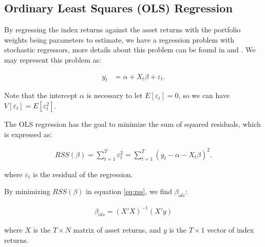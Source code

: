 \documentclass[12pt,oneside,a4paper]{memoir}
\begin{document}
\subsection{Ordinary Least Squares (OLS) Regression}

By regressing the index returns against the asset returns with the portfolio weights being parameters to estimate, we have a regression problem with stochastic regressors, more details about this problem can be found in  and .
We may represent this problem as:

\vspace{-18 pt}
\begin{align*} 
	y_{t} &= \alpha + X_{t}\beta + \varepsilon_{t}.
\end{align*}

\noindent
Note that the intercept $\alpha$ is necessary to let $E[\varepsilon_{t}]=0$, so we can have $V[\varepsilon_{t}] = E[\varepsilon_{t}^2]$.

The OLS regression has the goal to minimize the sum of squared residuals, which is expressed as:

\vspace{-18 pt}
\begin{align} \label{eq:rss}
	RSS(\beta)
	= \sum_{t=1}^{T} \varepsilon_t^2
	= \sum_{t=1}^{T} (y_t - \alpha - X_t \beta)^2.
\end{align}

\noindent
where $\varepsilon_{t}$ is the residual of the regression.

By minimizing $RSS(\beta)$ in equation \eqref{eq:rss}, we find $\beta_{ols}$:

\vspace{-18 pt}
\begin{align} 
	\label{eq:bols}
	\beta_{ols} = (X'X)^{-1}(X'y)
\end{align}

\noindent
where $X$ is the $T \times N$ matrix of asset returns, and $y$ is the $T\times 1$ vector of index returns.

\end{document}
